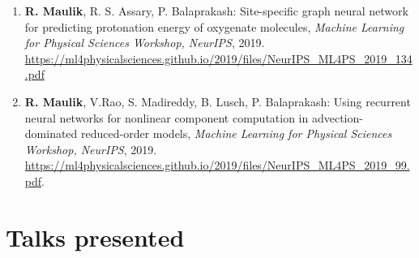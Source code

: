 \documentclass[letterpaper]{article}
\begin{document}
\begin{enumerate}
\item \textbf{R. Maulik}, R. S. Assary, P. Balaprakash: Site-specific graph neural network for predicting protonation energy of oxygenate molecules, {\it Machine Learning for Physical Sciences Workshop, NeurIPS}, 2019. \url{https://ml4physicalsciences.github.io/2019/files/NeurIPS_ML4PS_2019_134.pdf}

\item \textbf{R. Maulik}, V.Rao, S. Madireddy, B. Lusch, P. Balaprakash: Using recurrent neural networks for nonlinear component computation in advection-dominated reduced-order models, \textit{Machine Learning for Physical Sciences Workshop, NeurIPS}, 2019. \url{https://ml4physicalsciences.github.io/2019/files/NeurIPS_ML4PS_2019_99.pdf}.

\end{enumerate}



\section*{Talks presented}
\end{document}
